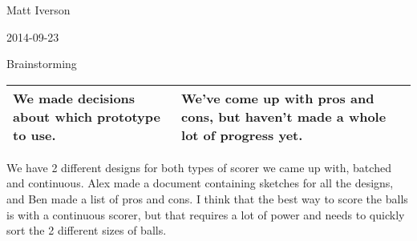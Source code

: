 Matt Iverson

2014-09-23

Brainstorming

\begin{tabular}{|p{5cm}|p{5cm}|}
 \hline
 We made decisions about which prototype to use.
&
 We’ve come up with pros and cons, but haven’t made a whole lot of progress yet.
\\
 \hline
\end{tabular}

We have 2 different designs for both types of scorer we came up with, batched and continuous. Alex made a document containing sketches for all the designs, and Ben made a list of pros and cons. I think that the best way to score the balls is with a continuous scorer, but that requires a lot of power and needs to quickly sort the 2 different sizes of balls.

